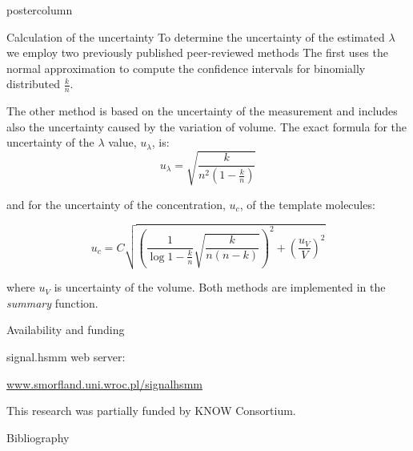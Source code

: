 \documentclass[final]{beamer}\usepackage[]{graphicx}\usepackage[]{color}
\newlength{\columnheight}
\begin{document}
\begin{frame}
\begin{columns}
    
    
    \begin{column}{.54\textwidth}
      \begin{beamercolorbox}[center,wd=\textwidth]{postercolumn}
        \begin{minipage}[T]{.95\textwidth}  
          \parbox[t][\columnheight]{\textwidth}
            {
     
    \begin{block}{Calculation of the uncertainty}
      To determine the uncertainty of the estimated $\lambda$ we employ two previously 
published peer-reviewed methods The first \cite{dube_mathematical_2008} uses the 
normal approximation to compute the confidence intervals for binomially 
distributed $\frac{k}{n}$.

The other method \cite{bhat_single_2009} is based on the uncertainty of the 
measurement and includes also the uncertainty caused by the variation of volume.
The exact formula for the uncertainty of the $\lambda$ value, $u_{\lambda}$,  
is:
\begin{equation}
u_{\lambda} = \sqrt{\frac{k}{n^2 (1 - \frac{k}{n})}}
\end{equation}

and for the uncertainty of the concentration, $u_{c}$, of the template 
molecules:

\begin{equation}
u_{c} = C \sqrt{ \left( \frac{1}{\log{1 - \frac{k}{n} }} 
\sqrt{\frac{k}{n (n - k)}} \right)^2 
+ \left( \frac{u_V}{V} \right)^2}
\end{equation}

where $u_V$ is uncertainty of the volume. Both methods are implemented in the 
\textit{summary} function.
    \end{block}
    \vfill 
    
        \begin{block}{Availability and funding}
        \footnotesize{
      signal.hsmm web server: 
      
      \url{www.smorfland.uni.wroc.pl/signalhsmm}
        }
        
        This research was partially funded by KNOW Consortium.
    \end{block}
    \vfill 
     
     
    \begin{block}{Bibliography}
    \tiny{
      
      
    }
    \end{block}
    \vfill
            }
        \end{minipage}
      \end{beamercolorbox}
    \end{column}
  \end{columns}  
\end{frame}
\end{document}
